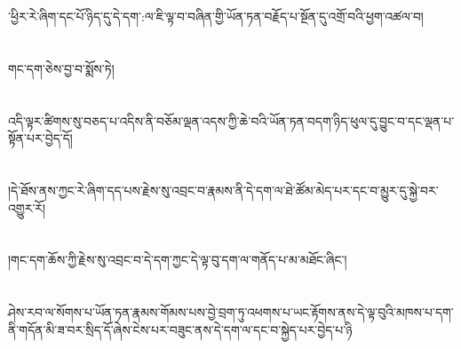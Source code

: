 ་ཕྱིར་རེ་ཞིག་དང་པོ་ཉིད་དུ་དེ་དག་:ལ་ཇི་ལྟ་བ་བཞིན་གྱི་ཡོན་ཏན་བརྗོད་པ་སྔོན་དུ་འགྲོ་བའི་ཕྱག་འཚལ་བ།\chapter{ }གང་དག་ཅེས་བྱ་བ་སྨོས་ཏེ།\chapter{ }འདི་ལྟར་ཚིགས་སུ་བཅད་པ་འདིས་ནི་བཅོམ་ལྡན་འདས་ཀྱི་ཆེ་བའི་ཡོན་ཏན་བདག་ཉིད་ཕུལ་དུ་བྱུང་བ་དང་ལྡན་པ་སྟོན་པར་བྱེད་དོ།\chapter{ }།དེ་ཐོས་ནས་ཀྱང་རེ་ཞིག་དད་པས་རྗེས་སུ་འབྲང་བ་རྣམས་ནི་དེ་དག་ལ་ཐེ་ཚོམ་མེད་པར་དང་བ་མྱུར་དུ་སྐྱེ་བར་འགྱུར་རོ།\chapter{ }།གང་དག་ཆོས་ཀྱི་རྗེས་སུ་འབྲང་བ་དེ་དག་ཀྱང་དེ་ལྟ་བུ་དག་ལ་གནོད་པ་མ་མཐོང་ཞིང་།\chapter{ }ཤེས་རབ་ལ་སོགས་པ་ཡོན་ཏན་རྣམས་གོམས་པས་བྱེ་བྲག་ཏུ་འཕགས་པ་ཡང་རྟོགས་ནས་དེ་ལྟ་བུའི་མཁས་པ་དག་ནི་གདོན་མི་ཟ་བར་སྲིད་དོ་ཞེས་ངེས་པར་བཟུང་ནས་དེ་དག་ལ་དང་བ་སྐྱེད་པར་བྱེད་པ་ཉི